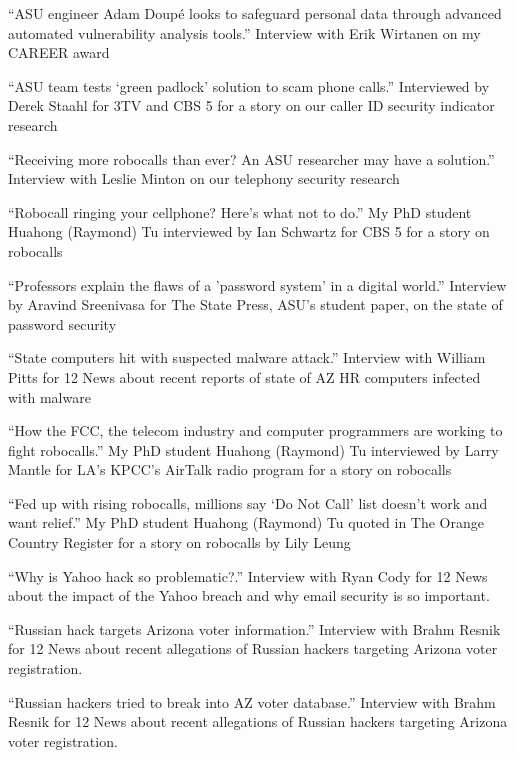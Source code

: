 \documentclass[11pt,letterpaper,sans]{moderncv}
\begin{document}
 {``ASU engineer Adam Doup\'e looks to
  safeguard personal data through advanced automated vulnerability
  analysis tools.'' Interview with Erik Wirtanen on my CAREER award} 

 {``ASU team tests `green padlock' solution to
  scam phone calls.'' Interviewed by Derek Staahl for 3TV and CBS 5
  for a story on our caller ID security indicator research}

 {``Receiving more robocalls than ever? An ASU
  researcher may have a solution.'' Interview with Leslie Minton on our
  telephony security research}

 {``Robocall ringing your cellphone? Here's
  what not to do.'' My PhD student Huahong (Raymond) Tu interviewed by
  Ian Schwartz for CBS 5 for a story on robocalls}

 {``Professors explain the flaws of a
  'password system' in a digital world.'' Interview by Aravind
  Sreenivasa for The State Press, ASU's student paper, on the state of
  password security}

 {``State computers hit with suspected
  malware attack.'' Interview with William Pitts for 12 News about
  recent reports of state of AZ HR computers infected with malware}

 {``How the FCC, the telecom industry and
  computer programmers are working to fight robocalls.'' My PhD
  student Huahong (Raymond) Tu interviewed by Larry Mantle for LA’s KPCC’s AirTalk radio program for a story on robocalls}

 {``Fed up with rising robocalls, millions
  say ‘Do Not Call’ list doesn’t work and want relief.'' My PhD
  student Huahong (Raymond) Tu quoted in The Orange Country Register for a story on robocalls by Lily Leung}

 {``Why is Yahoo hack so problematic?.'' Interview with Ryan Cody for 12 News about the impact of the Yahoo breach and why email security is so important.}

 {``Russian hack targets Arizona voter
  information.'' Interview with Brahm Resnik for 12 News about recent allegations of Russian hackers targeting Arizona voter registration.}

 {``Russian hackers tried to break into AZ
  voter database.'' Interview with Brahm Resnik for 12 News about recent allegations of Russian hackers targeting Arizona voter registration.}
\end{document}
